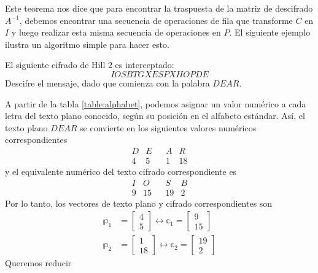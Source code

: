 Este teorema nos dice que para encontrar la traspuesta de la matriz de descifrado $A^{-1}$, debemos encontrar una secuencia de operaciones de fila que transforme $C$ en $I$ y luego realizar esta misma secuencia de operaciones en $P$. El siguiente ejemplo ilustra un algoritmo simple para hacer esto.

\begin{examplebox}{}{}
    El siguiente cifrado de Hill 2 es interceptado:
    $$IOSBTGXESPXHOPDE$$
    Descifre el mensaje, dado que comienza con la palabra $DEAR$.

    \tcblower
    \solucion A partir de la tabla \ref{table:alphabet}, podemos asignar un valor numérico a cada letra del texto plano conocido, según su posición en el alfabeto estándar. Así, el texto plano $DEAR$ se convierte en los siguientes valores numéricos correspondientes
    $$\begin{array}{ccccc}
        D & E & & A & R \\
        4 & 5 & & 1 & 18
    \end{array}$$
    y el equivalente numérico del texto cifrado correspondiente es
    $$\begin{array}{ccccc}
        I & O & & S & B \\
        9 & 15 & & 19 & 2
    \end{array}$$
    Por lo tanto, los vectores de texto plano y cifrado correspondientes son
    \begin{align*}
        \mathbb{p}_1 & = \begin{bmatrix}
            4 \\
            5
       \end{bmatrix} \leftrightarrow \mathbb{c}_1 = \begin{bmatrix}
           9 \\
           15
        \end{bmatrix} \\
        \mathbb{p}_2 & = \begin{bmatrix}
            1 \\
            18
        \end{bmatrix} \leftrightarrow \mathbb{c}_2 = \begin{bmatrix}
            19 \\
            2
        \end{bmatrix}
    \end{align*}
    Queremos reducir
    \begin{matrizn}

\end{matrizn}
\end{examplebox}
